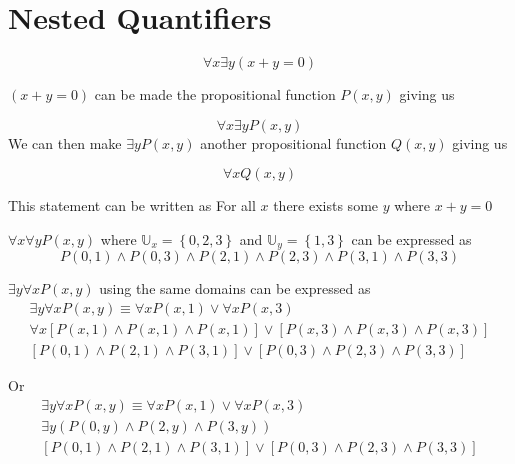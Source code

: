 \documentclass[12pt letter]{report}
\begin{document}
\pagebreak
\section{Nested Quantifiers}


\[
	\forall x \exists y \left( x + y = 0 \right)
\]

$ \left( x + y = 0 \right)  $ can be made the propositional function $P \left( x, y \right) $ giving us

\[
	\forall x \exists y P \left( x, y \right)
\]
We can then make $\exists y P \left( x, y \right) $ another propositional function $Q \left( x, y \right) $ giving us

\[
	\forall x Q \left( x, y \right)
\]

This statement can be written as For all $x$ there exists some $y$ where $x + y = 0$

\noindent $\forall x \forall y P \left( x, y \right) $ where $\mathbb{U}_{x} = \left\{ 0, 2, 3 \right\} $ and $\mathbb{U}_{y} =
	\left\{ 1,3 \right\} $ can be expressed as
\[
	P \left( 0,1 \right)  \wedge P \left( 0,3 \right) \wedge P \left( 2,1 \right)  \wedge P \left( 2,3 \right)  \wedge P
	\left( 3,1 \right)  \wedge P \left( 3,3 \right)
\]

\noindent $\exists y \forall x P \left( x,y \right) $ using the same domains can be expressed as
\begin{align*}
	\exists y \forall x P \left( x,y \right) \equiv \forall x P \left( x,1 \right)  \vee \forall x P \left( x,3
	\right)                                                                                         \\
	\forall x \left[ P \left( x, 1 \right) \wedge  P \left( x, 1 \right) \wedge  P \left( x,1 \right)    \right]  \vee
	\left[ P \left( x,3 \right) \wedge  P \left( x,3 \right) \wedge P \left( x,3 \right)    \right] \\
	\left[ P \left( 0,1 \right) \wedge  P \left( 2,1 \right) \wedge P \left( 3,1 \right)    \right]  \vee
	\left[ P \left( 0,3 \right) \wedge  P \left( 2,3 \right) \wedge  P \left( 3,3 \right)    \right]
\end{align*}


Or
\begin{align*}
	\exists y \forall x P \left( x,y \right) \equiv \forall x P \left( x,1 \right)  \vee \forall x P \left( x,3 \right)
	\\
	\exists y \left( P \left( 0, y \right) \wedge P \left( 2, y \right) \wedge P \left( 3, y \right)    \right) \\
	\left[ P \left( 0,1 \right) \wedge P \left( 2, 1 \right) \wedge P \left( 3, 1 \right)  \right] \vee \left[ P \left(
		0,3\right) \wedge P \left( 2,3 \right) \wedge P \left( 3,3 \right)     \right]
\end{align*}
\end{document}
